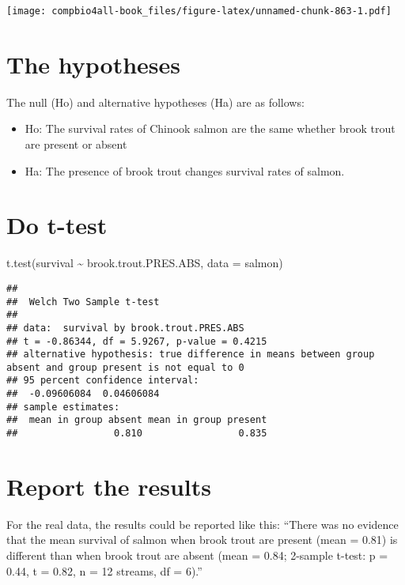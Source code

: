 \documentclass[
]{book}
\newenvironment{Shaded}{\begin{snugshade}}{\end{snugshade}}
\newcommand{\AttributeTok}[1]{\textcolor[rgb]{0.77,0.63,0.00}{#1}}
\newcommand{\FunctionTok}[1]{\textcolor[rgb]{0.00,0.00,0.00}{#1}}
\newcommand{\NormalTok}[1]{#1}
\newcommand{\SpecialCharTok}[1]{\textcolor[rgb]{0.00,0.00,0.00}{#1}}
\providecommand{\tightlist}{%
  \setlength{\itemsep}{0pt}\setlength{\parskip}{0pt}}
\begin{document}
\texttt{[image: compbio4all-book\_files/figure-latex/unnamed-chunk-863-1.pdf]}

\hypertarget{the-hypotheses}{%
\section{The hypotheses}\label{the-hypotheses}}

The null (Ho) and alternative hypotheses (Ha) are as follows:

\begin{itemize}
\tightlist
\item
  Ho: The survival rates of Chinook salmon are the same whether brook trout are present or absent
\item
  Ha: The presence of brook trout changes survival rates of salmon.
\end{itemize}

\hypertarget{do-t-test}{%
\section{Do t-test}\label{do-t-test}}

\begin{Shaded}
\begin{Highlighting}[]
\FunctionTok{t.test}\NormalTok{(survival }\SpecialCharTok{\textasciitilde{}}\NormalTok{ brook.trout.PRES.ABS, }
       \AttributeTok{data =}\NormalTok{ salmon)}
\end{Highlighting}
\end{Shaded}

\begin{verbatim}
## 
##  Welch Two Sample t-test
## 
## data:  survival by brook.trout.PRES.ABS
## t = -0.86344, df = 5.9267, p-value = 0.4215
## alternative hypothesis: true difference in means between group absent and group present is not equal to 0
## 95 percent confidence interval:
##  -0.09606084  0.04606084
## sample estimates:
##  mean in group absent mean in group present 
##                 0.810                 0.835
\end{verbatim}

\hypertarget{report-the-results}{%
\section{Report the results}\label{report-the-results}}

For the real data, the results could be reported like this:
``There was no evidence that the mean survival of salmon when brook trout are present (mean = 0.81) is different than when brook trout are absent (mean = 0.84; 2-sample t-test: p = 0.44, t = 0.82, n = 12 streams, df = 6).''
\end{document}
